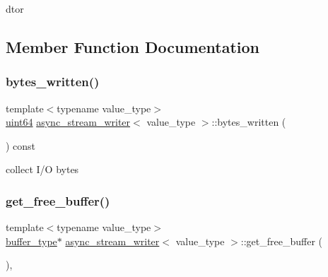 dtor 



\subsection{Member Function Documentation}
\mbox{\label{classasync__stream__writer_a6fd98bbc41adf1cd51468ee490608d6e}} 
\subsubsection{\texorpdfstring{bytes\+\_\+written()}{bytes\_written()}}
{\footnotesize\ttfamily template$<$typename value\+\_\+type$>$ \\
\hyperlink{types_8h_a60e8696a4678cd348e991a1f172e53f7}{uint64} \hyperlink{classasync__stream__writer}{async\+\_\+stream\+\_\+writer}$<$ value\+\_\+type $>$\+::bytes\+\_\+written (\begin{DoxyParamCaption}{ }\end{DoxyParamCaption}) const\hspace{0.3cm}{\ttfamily [inline]}}



collect I/O bytes 

\mbox{\label{classasync__stream__writer_ad73941af15cf207e12376db3e2ffbfcd}} 
\subsubsection{\texorpdfstring{get\+\_\+free\+\_\+buffer()}{get\_free\_buffer()}}
{\footnotesize\ttfamily template$<$typename value\+\_\+type$>$ \\
\hyperlink{classasync__stream__writer_a7e813664993581eab8d5fc6bcff2ce19}{buffer\+\_\+type}$\ast$ \hyperlink{classasync__stream__writer}{async\+\_\+stream\+\_\+writer}$<$ value\+\_\+type $>$\+::get\+\_\+free\+\_\+buffer (\begin{DoxyParamCaption}{ }\end{DoxyParamCaption})\hspace{0.3cm}{\ttfamily [inline]}, {\ttfamily [private]}}



